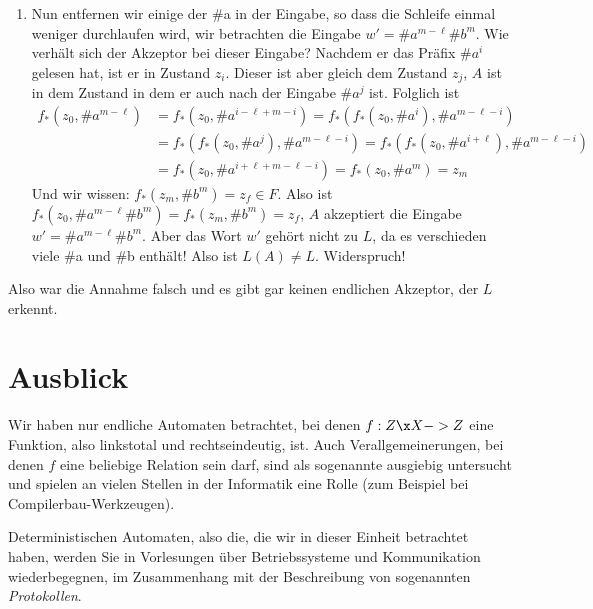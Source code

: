 \begin{beweis}
\begin{enumerate}
  \item Nun entfernen wir einige der \#a in der Eingabe, so dass die
    Schleife einmal weniger durchlaufen wird, \dh wir betrachten die
    Eingabe $w'=\#a^{m-\ell}\#b^m$. 
    Wie verhält sich der Akzeptor bei dieser Eingabe? 
    Nachdem er das Präfix $\#a^{i}$ gelesen hat, ist er in Zustand
    $z_{i}$.
    Dieser ist aber gleich dem Zustand $z_j$, \dh $A$ ist in dem
    Zustand in dem er auch nach der Eingabe $\#a^j$ ist. 
    Folglich ist 
    \begin{align*}
      f_*(z_0,\#a^{m-\ell}) & = f_*(z_0,\#a^{i-\ell+m-i}) = f_*(f_*(z_0,\#a^{i}), \#a^{m-\ell-i}) \\
      &= f_*(f_*(z_0,\#a^{j}), \#a^{m-\ell-i}) = f_*(f_*(z_0,\#a^{i+\ell}), \#a^{m-\ell-i}) \\
      &= f_*(z_0,\#a^{i+\ell+m-\ell-i}) = f_*(z_0,\#a^{m}) = z_m
    \end{align*}
    Und wir wissen: $f_*(z_m,\#b^m)=z_f\in F$. 
    Also ist $f_*(z_0,\#a^{m-\ell}\#b^m) = f_*(z_m, \#b^m) = z_f$, \dh
    $A$ akzeptiert die Eingabe $w'=\#a^{m-\ell}\#b^m$. Aber das Wort
    $w'$ gehört nicht zu $L$, da es verschieden viele \#a und \#b
    enthält! Also ist $L(A)\not=L$. Widerspruch!
  \end{enumerate}
  Also war die Annahme falsch und es gibt gar keinen endlichen
  Akzeptor, der $L$ erkennt.
\end{beweis}


\section{Ausblick}
\label{sec:ausblick}

Wir haben nur endliche Automaten betrachtet, bei denen $f:Z\x X->Z$
eine Funktion, also linkstotal und rechtseindeutig, ist. Auch
Verallgemeinerungen, bei denen $f$ eine beliebige Relation sein darf,
sind als sogenannte  ausgiebig
untersucht und spielen an vielen Stellen in der Informatik eine Rolle
(zum Beispiel bei Compilerbau-Werkzeugen).

Deterministischen Automaten, also die, die wir in dieser Einheit
betrachtet haben, werden Sie in Vorlesungen über Betriebssysteme und
Kommunikation wiederbegegnen, \zB im Zusammenhang mit der Beschreibung
von sogenannten \emph{Protokollen}.

\cleardoublepage

